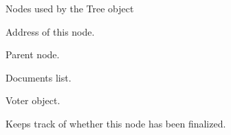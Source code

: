 \documentclass[letterpaper,10pt,english]{sphinxmanual}
\begin{document}

\begin{fulllineitems}
\label{\detokenize{index:ThresTree.TreeNode}}
Nodes used by the Tree object

\begin{fulllineitems}
\label{\detokenize{index:ThresTree.TreeNode.addr}}
 \textendash{} Address of this node.

\end{fulllineitems}


\begin{fulllineitems}
\label{\detokenize{index:ThresTree.TreeNode.parent}}
 \textendash{} Parent node.

\end{fulllineitems}


\begin{fulllineitems}
\label{\detokenize{index:ThresTree.TreeNode.documents}}
 \textendash{} Documents list.

\end{fulllineitems}


\begin{fulllineitems}
\label{\detokenize{index:ThresTree.TreeNode.voter}}
 \textendash{} Voter object.

\end{fulllineitems}


\begin{fulllineitems}
\label{\detokenize{index:ThresTree.TreeNode.finalized}}
 \textendash{} Keeps track of whether this node has been finalized.

\end{fulllineitems}


\end{fulllineitems}
\end{document}
